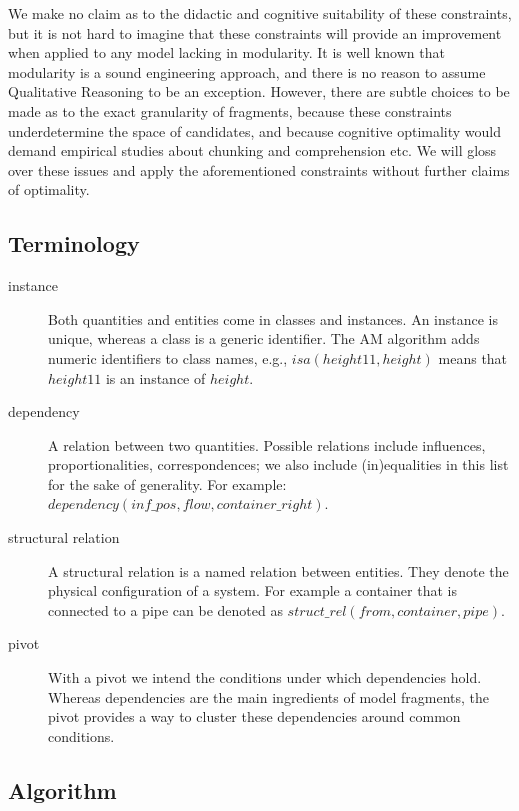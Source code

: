 \documentclass{article} %
\begin{document}
We make no claim as to the didactic and cognitive suitability of these
constraints, but it is not hard to imagine that these constraints will provide
an improvement when applied to any model lacking in modularity. It is well
known that modularity is a sound engineering approach, and there is no reason
to assume Qualitative Reasoning to be an exception. However, there are subtle
choices to be made as to the exact granularity of fragments, because these
constraints underdetermine the space of candidates, and because cognitive
optimality would demand empirical studies about chunking and comprehension
etc. We will gloss over these issues and apply the aforementioned constraints
without further claims of optimality.

\subsection{Terminology}

\begin{description}

\item[instance] Both quantities and entities come in classes and instances.
	An instance is unique, whereas a class is a generic identifier.
	The AM algorithm adds numeric identifiers to class names, e.g.,
	$isa(height11, height)$ means that $height11$ is an instance of
	$height$.


\item[dependency] A relation between two quantities. Possible relations
	include influences, proportionalities, correspondences; we also
	include (in)equalities in this list for the sake of generality.
	For example: $dependency(inf\_pos, flow, container\_right)$.

\item[structural relation]
	A structural relation is a named relation between entities. They denote
	the physical configuration of a system. For example a container that is
	connected to a pipe can be denoted as $struct\_rel(from, container,
	pipe)$.

\item[pivot]
	With a pivot we intend the conditions under which dependencies hold.
	Whereas dependencies are the main ingredients of model fragments,
	the pivot provides a way to cluster these dependencies around common
	conditions.

\end{description}

\subsection{Algorithm}
\end{document}
